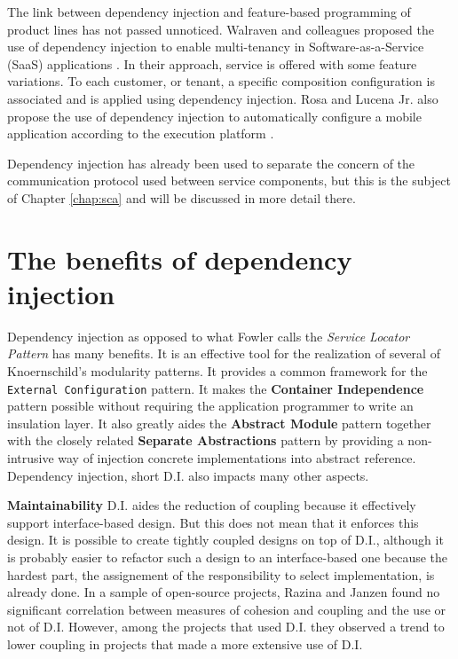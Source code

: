 The link between dependency injection and feature-based programming of product lines has not passed unnoticed.
Walraven and colleagues proposed the use of dependency injection to enable multi-tenancy in Software-as-a-Service
(SaaS) applications \cite{Walraven} \cite{Truyen}. In their approach, service is offered with some feature variations.
To each customer, or tenant, a specific composition configuration is associated and is applied using dependency
injection. Rosa and Lucena Jr. also propose the use of dependency injection to automatically configure a mobile
application according to the execution platform \cite{Rosa}.

Dependency injection has already been used to separate the concern of the communication protocol used between
service components, but this is the subject of Chapter \ref{chap:sca} and will be discussed in more detail there.

\section{The benefits of dependency injection}

Dependency injection as opposed to what Fowler calls the \emph{Service Locator Pattern} has many benefits.
It is an effective tool for the realization of several of Knoernschild's modularity patterns. It provides
a common framework for the \texttt{External Configuration} pattern. It makes the \textbf{Container Independence}
pattern possible without requiring the application programmer to write an insulation layer. It also greatly
aides the \textbf{Abstract Module} pattern together with the closely related \textbf{Separate Abstractions} pattern
by providing a non-intrusive way of injection concrete implementations into abstract reference.
Dependency injection, short D.I. also impacts many other aspects.

\textbf{Maintainability} D.I. aides the reduction of coupling because it effectively support interface-based
design. But this does not mean that it enforces this design. It is possible to create tightly coupled
designs on top of D.I., although it is probably easier to refactor such a design to an interface-based
one because the hardest part, the assignement of the responsibility to select implementation, is already
done. In a sample of open-source projects, Razina and Janzen found no significant correlation between
measures of cohesion and coupling and the use or not of D.I. However, among the projects that used D.I.
they observed a trend to lower coupling in projects that made a more extensive use of D.I. \cite{Razina}

